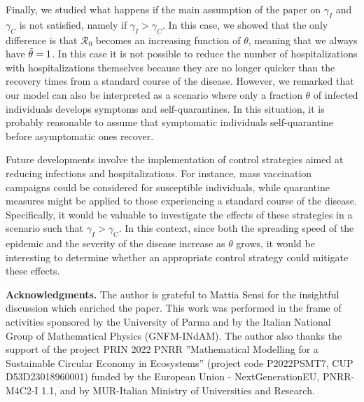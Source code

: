 \documentclass[11pt,reqno]{amsart}
\theoremstyle{boldremark}
\begin{document}
Finally, we studied what happens if the main assumption of the paper on $\gamma_I$ and $\gamma_C$ is not satisfied, namely if $\gamma_I > \gamma_C$. In this case, we showed that the only difference is that $\mathcal{R}_0$ becomes an increasing function of $\theta$, meaning that we always have $\Tilde{\theta}=1$. In this case it is not possible to reduce the number of hospitalizations with hospitalizations themselves because they are no longer quicker than the recovery times from a standard course of the disease. However, we remarked that our model can also be interpreted as a scenario where only a fraction $\theta$ of infected individuals develops symptoms and self-quarantines. In this situation, it is probably reasonable to assume that symptomatic individuals self-quarantine before asymptomatic ones recover. 

Future developments involve the implementation of control strategies aimed at reducing infections and hospitalizations. For instance, mass vaccination campaigns could be considered for susceptible individuals, while quarantine measures might be applied to those experiencing a standard course of the disease. Specifically, it would be valuable to investigate the effects of these strategies in a scenario such that $\gamma_I > \gamma_C$. In this context, since both the spreading speed of the epidemic and the severity of the disease increase as $\theta$ grows, it would be interesting to determine whether an appropriate control strategy could mitigate these effects.

\bigskip
\bigskip
\noindent \textbf{Acknowledgments.} The author is grateful to Mattia Sensi for the insightful discussion which enriched the paper. This work was performed in the frame of activities sponsored by the University of Parma and by the Italian National Group of Mathematical Physics (GNFM-INdAM). The author also thanks the support of the project PRIN 2022 PNRR ”Mathematical Modelling for a Sustainable Circular Economy in Ecosystems” (project code P2022PSMT7, CUP D53D23018960001) funded by the European Union - NextGenerationEU, PNRR-M4C2-I 1.1, and by MUR-Italian Ministry of Universities and Research.

\bigskip
\nocite{*}


\bigskip
\bigskip

\setlength\parindent{0pt}
\end{document}
